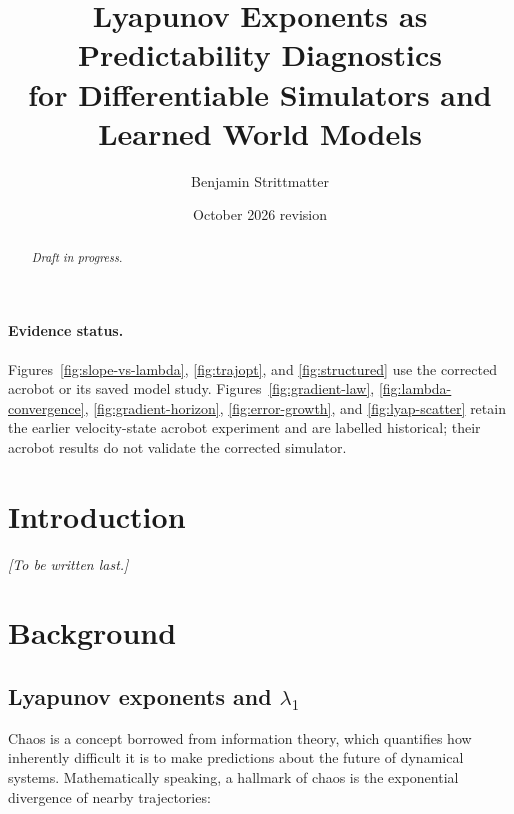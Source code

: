 \documentclass[11pt]{article}
\title{Lyapunov Exponents as Predictability Diagnostics\\
for Differentiable Simulators and Learned World Models}
\author{Benjamin Strittmatter}
\date{October 2026 revision}
\begin{document}
\maketitle

\begin{abstract}
\emph{Draft in progress.}
\end{abstract}

\tableofcontents
\newpage
\paragraph{Evidence status.}
Figures~\ref{fig:slope-vs-lambda}, \ref{fig:trajopt}, and \ref{fig:structured}
use the corrected acrobot or its saved model study. Figures~\ref{fig:gradient-law},
\ref{fig:lambda-convergence}, \ref{fig:gradient-horizon}, \ref{fig:error-growth}, and
\ref{fig:lyap-scatter} retain the earlier velocity-state acrobot experiment and are
labelled historical; their acrobot results do not validate the corrected simulator.

\section{Introduction}\label{sec:intro}
\emph{[To be written last.]}

\section{Background}\label{sec:background}

\subsection{Lyapunov exponents and \texorpdfstring{$\lambda_1$}{lambda1}}\label{sec:bg-lyapunov}


Chaos is a concept borrowed from information theory, which quantifies how inherently difficult it is to make predictions about the future of dynamical systems. Mathematically speaking, a hallmark of chaos is the exponential divergence of nearby trajectories:
\end{document}
